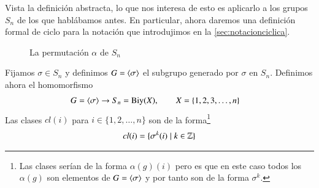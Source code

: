 Vista la definición abstracta, lo que nos interesa de esto es aplicarlo a los grupos $S_n$ de los que hablábamos antes. En particular, ahora daremos una definición formal de ciclo para la notación que introdujimos en la \autoref{sec:notacionciclica}.

\begin{wrapfigure}{l}{0.3\textwidth}
	\caption{La permutación $\alpha$ de $S_n$}
	\label{fig:permalphaejpart}
\end{wrapfigure}

Fijamos $\sigma \in S_n$ y definimos $G = \langle\sigma\rangle$ el subgrupo generado por $\sigma$ en $S_n$. Definimos ahora el homomorfismo
\begin{align*}
G = \langle\sigma\rangle & \to S_n = \text{Biy}(X),\qquad X = \{1, 2, 3, \dots, n\}
\end{align*}
Las clases $cl(i)$ para $i \in \{1, 2, \dots, n\}$ son de la forma\footnote{Las clases serían de la forma $\alpha(g)(i)$ pero es que en este caso todos los $\alpha(g)$ son elementos de $G = \langle\sigma\rangle$ y por tanto son de la forma $\sigma^k$.}
\begin{align*}
cl(i) = \{\sigma^k(i) \mid k \in \mathbb{Z}\}
\end{align*}


